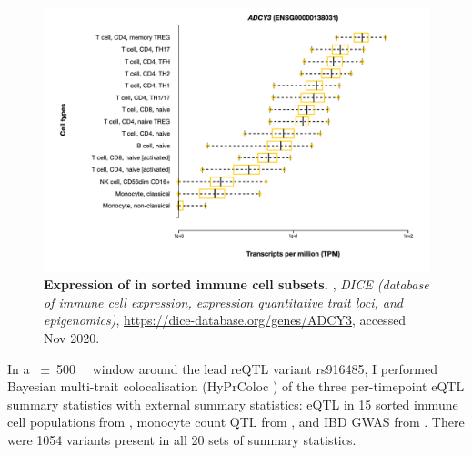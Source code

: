 \begin{figure}
    \centering
    \includegraphics[width=1.0\textwidth,page=1]{mainmatter/figures/chapter_03/ADCY3_expression.png}
    \caption{
        \textbf{Expression of  in sorted immune cell subsets.}
        \textcite{schmiedel2018ImpactGeneticPolymorphisms}, 
        \textit{DICE (database of immune cell expression, expression quantitative trait loci, and epigenomics)}, 
        \url{https://dice-database.org/genes/ADCY3}, accessed Nov 2020.
    }
    \label{fig:hird_reQTL_ADCY3_expression_DICE}
\end{figure}

In a \SI{\pm 500}{\mega\bp} window around the lead \gls{reQTL} variant rs916485,
I performed Bayesian multi-trait colocalisation ({HyPrColoc} \autocite{foley2019FastEfficientColocalization}) of
the three per-timepoint  \gls{eQTL} summary statistics with external summary statistics: 
 \gls{eQTL} in 15 sorted immune cell populations from \textcite{schmiedel2018ImpactGeneticPolymorphisms},
monocyte count \gls{QTL} from \textcite{astle2016AllelicLandscapeHuman},
and \gls{IBD} \gls{GWAS} from \textcite{delange2017GenomewideAssociationStudy}.
There were 1054 variants present in all 20 sets of summary statistics.

